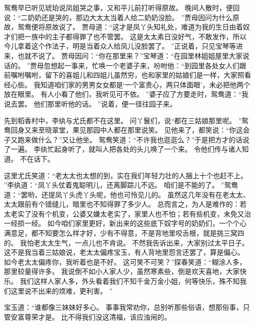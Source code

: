\par
鸳鸯早已听见琥珀说凤姐哭之事，又和平儿前打听得原故。
晚间人散时，便回说：“二奶奶还是哭的，那边大太太当着人给二奶奶没脸。
”贾母因问为什么原故，鸳鸯便将原故说了。
贾母道：“这才是凤丫头知礼处，难道为我的生日由着奴才们把一族中的主子都得罪了也不管罢。
这是太太素日没好气，不敢发作，所以今儿拿着这个作法子，明是当着众人给凤儿没脸罢了。
”正说着，只见宝琴等进来，也就不说了。
贾母因问：“你在那里来？”宝琴道：“在园里林姐姐屋里大家说话的。
”贾母忽想起一事来，忙唤一个老婆子来，吩咐他：“到园里各处女人们跟前嘱咐嘱咐，留下的喜姐儿和四姐儿虽然穷，也和家里的姑娘们是一样，大家照看经心些。
我知道咱们家的男男女女都是‘一个富贵心，两只体面眼’，未必把他两个放在眼里。
有人小看了他们，我听见可不依。
”婆子应了方要走时，鸳鸯道：“我说去罢。
他们那里听他的话。
”说着，便一径往园子来。
\par
先到稻香村中，李纨与尤氏都不在这里。
问丫鬟们，说“都在三姑娘那里呢。
”鸳鸯回身又来至晓翠堂，果见那园中人都在那里说笑。
见他来了，都笑说：“你这会子又跑来做什么？”又让他坐。
鸳鸯笑道：“不许我也逛逛么？”于是把方才的话说了一遍。
李纨忙起身听了，就叫人把各处的头儿唤了一个来。
令他们传与诸人知道。
不在话下。
\par
这里尤氏笑道：“老太太也太想的到，实在我们年轻力壮的人捆上十个也赶不上。
”李纨道：“凤丫头仗着鬼聪明儿，还离脚踪儿不远。
咱们是不能的了。
”鸳鸯道：“罢哟，还提凤丫头虎丫头呢，他也可怜见儿的。
虽然这几年没有在老太太、太太跟前有个错缝儿，暗里也不知得罪了多少人。
总而言之，为人是难作的：若太老实了没有个机变，公婆又嫌太老实了，家里人也不怕；若有些机变，未免又治一经损一经。
如今咱们家里更好，新出来的这些底下奴字号的奶奶们，一个个心满意足，都不知要怎么样才好，少有不得意，不是背地里咬舌根，就是挑三窝四的。
我怕老太太生气，一点儿也不肯说。
不然我告诉出来，大家别过太平日子。
这不是我当着三姑娘说，老太太偏疼宝玉，有人背地里怨言还罢了，算是偏心。
如今老太太偏疼你，我听着也是不好。
这可笑不可笑？”探春笑道：“糊涂人多，那里较量得许多。
我说倒不如小人家人少，虽然寒素些，倒是欢天喜地，大家快乐。
我们这样人家人多，外头看着我们不知千金万金小姐，何等快乐，殊不知我们这里说不出来的烦难，更利害。
”\par
宝玉道：“谁都像三妹妹好多心。
事事我常劝你，总别听那些俗语，想那俗事，只管安富尊荣才是。
比不得我们没这清福，该应浊闹的。
